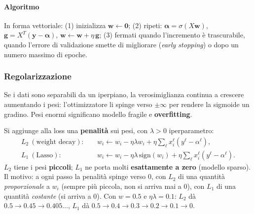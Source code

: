 \documentclass[12pt]{extarticle}
\begin{document}
\paragraph{Algoritmo}
In forma vettoriale: (1) inizializza $\mathbf{w}\leftarrow\mathbf{0}$; (2) ripeti: $\boldsymbol{\alpha}=\sigma(X\mathbf{w})$, $\mathbf{g}=X^T(\mathbf{y}-\boldsymbol{\alpha})$, $\mathbf{w}\leftarrow\mathbf{w}+\eta\,\mathbf{g}$; (3) fermati quando l'incremento è trascurabile, quando l'errore di validazione smette di migliorare (\emph{early stopping}) o dopo un numero massimo di epoche.

\subsubsection{Regolarizzazione}

\noindent Se i dati sono separabili da un iperpiano, la verosimiglianza continua a crescere aumentando i pesi: l'ottimizzatore li spinge verso $\pm\infty$ per rendere la sigmoide un gradino. Pesi enormi significano modello fragile e \textbf{overfitting}.

\begin{center}
\end{center}

\noindent Si aggiunge alla loss una \textbf{penalità} sui pesi, con $\lambda>0$ iperparametro:
\begin{align*}
L_2\ (\text{weight decay}):&\quad w_i\leftarrow w_i-\eta\lambda w_i+\eta\textstyle\sum_\ell x_i^\ell(y^\ell-\alpha^\ell),\\
L_1\ (\text{Lasso}):&\quad w_i\leftarrow w_i-\eta\lambda\,\mathrm{sign}(w_i)+\eta\textstyle\sum_\ell x_i^\ell(y^\ell-\alpha^\ell).
\end{align*}
$L_2$ tiene i pesi \textbf{piccoli}; $L_1$ ne porta molti \textbf{esattamente a zero} (modello sparso). Il motivo: a ogni passo la penalità spinge verso 0, con $L_2$ di una quantità \emph{proporzionale} a $w_i$ (sempre più piccola, non si arriva mai a 0), con $L_1$ di una quantità \emph{costante} (si arriva a 0). Con $w=0.5$ e $\eta\lambda=0.1$: $L_2$ dà $0.5\to0.45\to0.405\dots$, $L_1$ dà $0.5\to0.4\to0.3\to0.2\to0.1\to0$.
\end{document}

